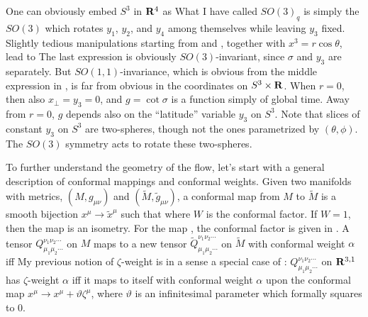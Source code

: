 \documentclass[12pt]{article}
\begin{document}
One can obviously embed $S^3$ in ${\bf R}^4$ as
What I have called $SO(3)_q$ is simply the $SO(3)$ which rotates $y_1$, $y_2$, and $y_4$ among themselves while leaving $y_3$ fixed.  Slightly tedious manipulations starting from  and , together with $x^3 = r \cos\theta$, lead to
The last expression is obviously $SO(3)$-invariant, since $\sigma$ and $y_3$ are separately.  But $SO(1,1)$-invariance, which is obvious from the middle expression in , is far from obvious in the coordinates on $S^3 \times {\bf R}$.  When $r=0$, then also $x_\perp = y_3=0$, and $g = \cot\sigma$ is a function simply of global time.  Away from $r=0$, $g$ depends also on the ``latitude'' variable $y_3$ on $S^3$.  Note that slices of constant $y_3$ on $S^3$ are two-spheres, though not the ones parametrized by $(\theta,\phi)$.  The $SO(3)$ symmetry acts to rotate these two-spheres.

To further understand the geometry of the flow, let's start with a general description of conformal mappings and conformal weights.  Given two manifolds with metrics, $(M,g_{\mu\nu})$ and $(\tilde{M},\tilde{g}_{\mu\nu})$, a conformal map from $M$ to $\tilde{M}$ is a smooth bijection $x^\mu \to \tilde{x}^\mu$ such that
where $W$ is the conformal factor.  If $W=1$, then the map is an isometry.  For the map , the conformal factor is given in .  A tensor $Q_{\mu_1\mu_2\cdots}^{\nu_1\nu_2\cdots}$ on $M$ maps to a new tensor $\tilde{Q}_{\mu_1\mu_2\cdots}^{\nu_1\nu_2\cdots}$ on $\tilde{M}$ with conformal weight $\alpha$ iff
My previous notion of $\zeta$-weight is in a sense a special case of : $Q_{\mu_1\mu_2\cdots}^{\nu_1\nu_2\cdots}$ on ${\bf R}^{3,1}$ has $\zeta$-weight $\alpha$ iff it maps to itself with conformal weight $\alpha$ upon the conformal map $x^\mu \to x^\mu + \vartheta \zeta^\mu$, where $\vartheta$ is an infinitesimal parameter which formally squares to $0$.
\end{document}
